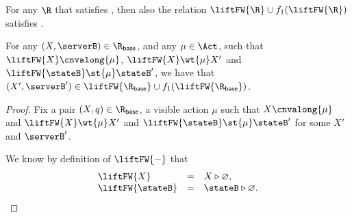 {  %



    
  \begin{lemma}
    For any $\R$ that satisfies ,
    then also the relation $\liftFW{\R} \cup f_1(\liftFW{\R})$ satisfies .
  \end{lemma}

  


  
  \begin{lemma}
    \label{lem:preservation-coind-continuations-mu-1}
    For any $(X, \serverB) \in {\Rbase}$,
    and any $\mu \in \Act$,
    such that $\liftFW{X} \cnvalong{\mu}$, $\liftFW{X} \wt{\mu} X'$ and $\liftFW{\stateB} \st{\mu} \stateB'$,
    we have that $(X', \serverB') \in \liftFW{\Rbase } \cup f_1(\liftFW{\Rbase} )$.
  \end{lemma}
  \begin{proof}
    Fix a pair $(X, q) \in {\Rbase}$, %
    a visible action $\mu$ such that $X \cnvalong{\mu}$
    and $\liftFW{ X } \wt{\mu} X'$ and $\liftFW{\stateB} \st{\mu} \stateB'$
    for some $ X'$ and $\serverB'$.
    
    We know by definition of $\liftFW{-}$ that 
    $$
    \begin{array}{lll}
      \liftFW{ X } & = & X \triangleright \varnothing,\\
      \liftFW{ \stateB } & = & \stateB \triangleright \varnothing.
    \end{array}
    $$


\end{proof}}

